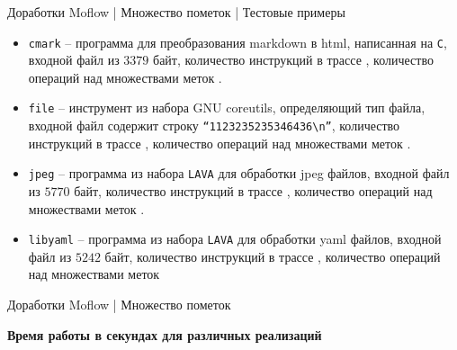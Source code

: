 \documentclass[10pt]{beamer}
\begin{document}
\begin{frame}{Доработки Moflow | Множество пометок | Тестовые примеры}
\begin{itemize}
    \item \texttt{cmark} -- программа для преобразования markdown в html, написанная на \texttt{C}, входной файл из $3379$ байт, количество инструкций в трассе , количество операций над множествами меток .
    \item \texttt{file} -- инструмент из набора GNU coreutils, определяющий тип файла, входной файл содержит строку \texttt{``1123235235346436\textbackslash n''}, количество инструкций в трассе , количество операций над множествами меток .
    \item \texttt{jpeg} -- программа из набора \texttt{LAVA}  для обработки jpeg файлов, входной файл из $5770$ байт, количество инструкций в трассе , количество операций над множествами меток .
    \item \texttt{libyaml} -- программа из набора \texttt{LAVA} для обработки yaml файлов, входной файл из $5242$ байт, количество инструкций в трассе , количество операций над множествами меток 
\end{itemize}
\end{frame}

\begin{frame}{Доработки Moflow | Множество пометок}

    \textbf{Время работы в секундах для различных реализаций}\\
\end{frame}

\end{document}

